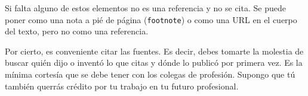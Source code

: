 Si falta alguno de estos elementos no es una referencia y no se cita.  Se puede poner como una nota a pié de página (\texttt{footnote}) o como una URL en el cuerpo del texto, pero no como una referencia.

Por cierto, es conveniente citar las fuentes.  Es decir, debes tomarte la molestia de buscar quién dijo o inventó lo que citas y dónde lo publicó por primera vez.  Es la mínima cortesía que se debe tener con los colegas de profesión.  Supongo que tú también querrás crédito por tu trabajo en tu futuro profesional.
